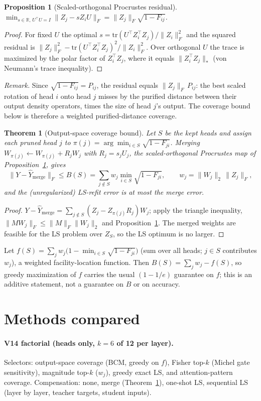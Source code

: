 \documentclass[11pt]{article}
\newtheorem{proposition}{Proposition}
\newtheorem{theorem}{Theorem}
\begin{document}
\begin{proposition}[Scaled-orthogonal Procrustes residual]\label{prop:proc}
$\min_{s\in\mathbb{R},\,U^\top U=I}\|Z_j-sZ_iU\|_F=\|Z_j\|_F\sqrt{1-F_{ij}}$.
\end{proposition}
\begin{proof}
For fixed $U$ the optimal $s=\mathrm{tr}(U^\top Z_i^\top Z_j)/\|Z_i\|_F^2$ and the squared residual is
$\|Z_j\|_F^2-\mathrm{tr}(U^\top Z_i^\top Z_j)^2/\|Z_i\|_F^2$. Over orthogonal $U$ the trace is maximized by the polar
factor of $Z_i^\top Z_j$, where it equals $\|Z_i^\top Z_j\|_*$ (von Neumann's trace inequality).
\end{proof}
\noindent\emph{Remark.} Since $\sqrt{1-F_{ij}}=P_{ij}$, the residual equals $\|Z_j\|_F\,P_{ij}$: the best scaled rotation of
head $i$ onto head $j$ misses by the purified distance between their output density operators, times the size of head $j$'s
output. The coverage bound below is therefore a weighted purified-distance coverage.

\begin{theorem}[Output-space coverage bound]\label{thm:bound}
Let $S$ be the kept heads and assign each pruned head $j$ to $\pi(j)=\arg\min_{i\in S}\sqrt{1-F_{ji}}$. Merging
$W_{\pi(j)}\leftarrow W_{\pi(j)}+R_jW_j$ with $R_j=s_jU_j$, the scaled-orthogonal Procrustes map of Proposition~\ref{prop:proc}, gives
\[\|Y-\widehat Y_{\mathrm{merge}}\|_F\le B(S)=\sum_{j\notin S}w_j\min_{i\in S}\sqrt{1-F_{ji}},\qquad
w_j=\|W_j\|_2\,\|Z_j\|_F,\]
and the (unregularized) LS-refit error is at most the merge error.
\end{theorem}
\begin{proof}
$Y-\widehat Y_{\mathrm{merge}}=\sum_{j\notin S}(Z_j-Z_{\pi(j)}R_j)W_j$; apply the triangle inequality,
$\|MW_j\|_F\le\|M\|_F\|W_j\|_2$ and Proposition~\ref{prop:proc}. The merged weights are feasible for the LS problem
over $Z_S$, so the LS optimum is no larger.
\end{proof}
Let $f(S)=\sum_{j}w_j\big(1-\min_{i\in S}\sqrt{1-F_{ji}}\big)$ (sum over all heads; $j\in S$ contributes $w_j$), a weighted facility-location function. Then $B(S)=\sum_{j}w_j-f(S)$, so greedy maximization of $f$ carries
the usual $(1-1/e)$ guarantee on $f$; this is an additive statement, not a guarantee on $B$ or on accuracy.

\section{Methods compared}
\paragraph{V14 factorial (heads only, $k=6$ of 12 per layer).} Selectors: output-space coverage (BCM, greedy on $f$),
Fisher top-$k$ (Michel gate sensitivity), magnitude top-$k$ ($w_j$), greedy exact LS, and attention-pattern coverage.
Compensation: none, merge (Theorem~\ref{thm:bound}), one-shot LS, sequential LS (layer by layer, teacher targets,
student inputs).
\end{document}
